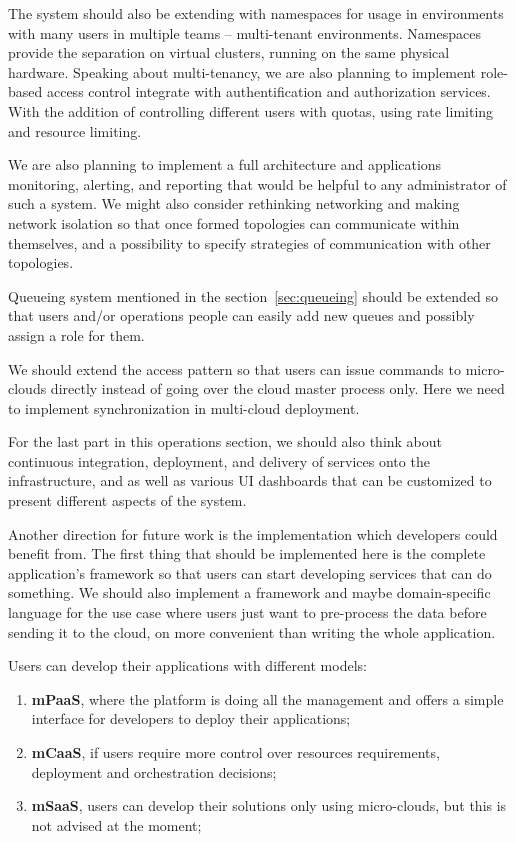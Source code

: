 The system should also be extending with namespaces for usage in environments with many users in multiple teams -- multi-tenant environments. Namespaces provide the separation on virtual clusters, running on the same physical hardware. Speaking about multi-tenancy, we are also planning to implement role-based access control integrate with authentification and authorization services. With the addition of controlling different users with quotas, using rate limiting and resource limiting.

We are also planning to implement a full architecture and applications monitoring, alerting, and reporting that would be helpful to any administrator of such a system. We might also consider rethinking networking and making network isolation so that once formed topologies can communicate within themselves, and a possibility to specify 
strategies of communication with other topologies.

Queueing system mentioned in the section~\ref{sec:queueing} should be extended so that users and/or operations people can easily add new queues and possibly assign a role for them.

We should extend the access pattern so that users can issue commands to micro-clouds directly instead of going over the cloud master process only. Here we need to implement synchronization in multi-cloud deployment.

For the last part in this operations section, we should also think about continuous integration, deployment, and delivery of services onto the infrastructure, and as well as various UI dashboards that can be customized to present different aspects of the system.

Another direction for future work is the implementation which developers could benefit from. The first thing that should be implemented here is the complete application's framework so that users can start developing services that can do something. We should also implement a framework and maybe domain-specific language for the use case where users just want to pre-process the data before sending it to the cloud, on more convenient than writing the whole application.

Users can develop their applications with different models: 

\begin{enumerate}[start=1,label={(\bfseries \arabic*)}]
	\item \textbf{mPaaS}, where the platform is doing all the management and offers a simple interface for developers to deploy their applications;
	\item \textbf{mCaaS}, if users require more control over resources requirements, deployment and orchestration decisions;
	\item \textbf{mSaaS}, users can develop their solutions only using micro-clouds, but this is not advised at the moment;
\end{enumerate}

